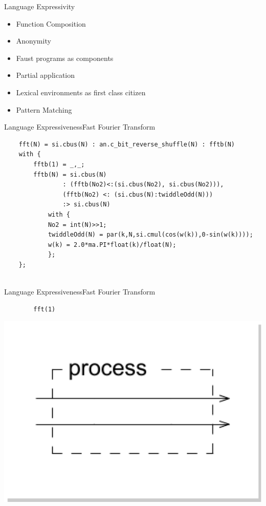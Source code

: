 
\begin{frame}[fragile]{Language Expressivity}
    \begin{itemize}
        \item Function Composition
        \item Anonymity
        \item Faust programs as components
        \item Partial application
        \item Lexical environments as first class citizen
        \item Pattern Matching
    \end{itemize}
\end{frame}


\begin{frame}[fragile,shrink=30]{Language Expressiveness}{Fast Fourier Transform}
    \vspace{1cm}
    \begin{lstlisting}
    fft(N) = si.cbus(N) : an.c_bit_reverse_shuffle(N) : fftb(N)
    with {
        fftb(1) = _,_;
        fftb(N) = si.cbus(N)
                : (fftb(No2)<:(si.cbus(No2), si.cbus(No2))),
                (fftb(No2) <: (si.cbus(N):twiddleOdd(N)))
                :> si.cbus(N)
            with {
            No2 = int(N)>>1;
            twiddleOdd(N) = par(k,N,si.cmul(cos(w(k)),0-sin(w(k))));
            w(k) = 2.0*ma.PI*float(k)/float(N);
            };
    };
    
    \end{lstlisting}
\end{frame}
        
\begin{frame}[fragile,shrink=30]{Language Expressiveness}{Fast Fourier Transform}
    \vspace{1cm}
    \begin{lstlisting}
        fft(1)
    \end{lstlisting}

    \begin{center}
        \includegraphics[width=1\textwidth]{images/fft1}
    \end{center}
\end{frame}
 
